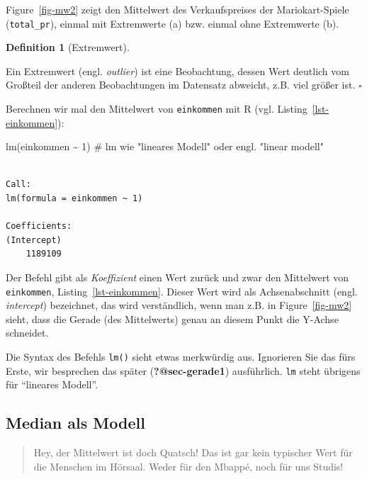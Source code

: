 \documentclass[
  letterpaper,
  DIV=11,
  numbers=noendperiod]{scrartcl}
\newenvironment{Shaded}{\begin{snugshade}}{\end{snugshade}}
\newcommand{\CommentTok}[1]{\textcolor[rgb]{0.37,0.37,0.37}{#1}}
\newcommand{\DecValTok}[1]{\textcolor[rgb]{0.68,0.00,0.00}{#1}}
\newcommand{\FunctionTok}[1]{\textcolor[rgb]{0.28,0.35,0.67}{#1}}
\newcommand{\NormalTok}[1]{\textcolor[rgb]{0.00,0.23,0.31}{#1}}
\newcommand{\SpecialCharTok}[1]{\textcolor[rgb]{0.37,0.37,0.37}{#1}}
\theoremstyle{definition}
\theoremstyle{definition}
\theoremstyle{definition}
\newtheorem{definition}{Definition}[section]
\theoremstyle{remark}
\begin{document}
Figure~\ref{fig-mw2} zeigt den Mittelwert des Verkaufspreises der
Mariokart-Spiele (\texttt{total\_pr}), einmal mit Extremwerte (a) bzw.
einmal ohne Extremwerte (b).

\begin{definition}[Extremwert]\protect\hypertarget{def-extremwert}{}\label{def-extremwert}

Ein Extremwert (engl. \emph{outlier}) ist eine Beobachtung, dessen Wert
deutlich vom Großteil der anderen Beobachtungen im Datensatz abweicht,
z.B. viel größer ist. \(\square\)

\end{definition}

Berechnen wir mal den Mittelwert von \texttt{einkommen} mit R (vgl.
Listing~\ref{lst-einkommen}):

\begin{Shaded}
\begin{Highlighting}[]
\FunctionTok{lm}\NormalTok{(einkommen }\SpecialCharTok{\textasciitilde{}} \DecValTok{1}\NormalTok{)  }\CommentTok{\# lm wie "lineares Modell" oder engl. "linear modell"}
\end{Highlighting}
\end{Shaded}

\begin{verbatim}

Call:
lm(formula = einkommen ~ 1)

Coefficients:
(Intercept)  
    1189109  
\end{verbatim}

Der Befehl gibt als \emph{Koeffizient} einen Wert zurück und zwar den
Mittelwert von \texttt{einkommen}, Listing~\ref{lst-einkommen}. Dieser
Wert wird als Achsenabschnitt (engl. \emph{intercept}) bezeichnet, das
wird verständlich, wenn man z.B. in Figure~\ref{fig-mw2} sieht, dass die
Gerade (des Mittelwerts) genau an diesem Punkt die Y-Achse schneidet.

Die Syntax des Befehls \texttt{lm()} sieht etwas merkwürdig aus.
Ignorieren Sie das fürs Erste, wir besprechen das später
(\textbf{?@sec-gerade1}) ausführlich. \texttt{lm} steht übrigens für
``lineares Modell''.

\subsection{Median als Modell}\label{sec-median}

\begin{quote}
{} Hey, der Mittelwert ist doch Quatsch! Das ist gar kein
typischer Wert für die Menschen im Hörsaal. Weder für den Mbappé, noch
für uns Studis!
\end{quote}
\end{document}
